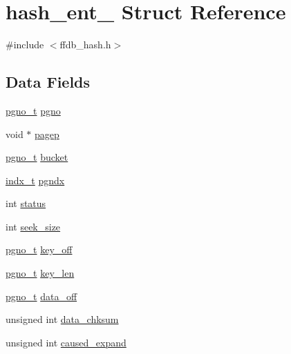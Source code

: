 \hypertarget{structhash__ent__}{}\section{hash\+\_\+ent\+\_\+ Struct Reference}
\label{structhash__ent__}


{\ttfamily \#include $<$ffdb\+\_\+hash.\+h$>$}

\subsection*{Data Fields}
\begin{DoxyCompactItemize}
\item 
\mbox{\hyperlink{other__libs_2filedb_2filehash_2ffdb__db_8h_a000813331643d38481142bcce7de1501}{pgno\+\_\+t}} \mbox{\hyperlink{structhash__ent___a09aab3f7ff5db11d8f4207bb6b517d6f}{pgno}}
\item 
void $\ast$ \mbox{\hyperlink{structhash__ent___ae175bd0cc409d75c94a03e21173f2c39}{pagep}}
\item 
\mbox{\hyperlink{other__libs_2filedb_2filehash_2ffdb__db_8h_a000813331643d38481142bcce7de1501}{pgno\+\_\+t}} \mbox{\hyperlink{structhash__ent___ae2b9802542ef673d965ee83cb4d755f2}{bucket}}
\item 
\mbox{\hyperlink{other__libs_2filedb_2filehash_2ffdb__db_8h_a09ffd06672b99d3312cd7e19d4b05e45}{indx\+\_\+t}} \mbox{\hyperlink{structhash__ent___a6e6bafab03bc8626e663d23d0a99e70a}{pgndx}}
\item 
int \mbox{\hyperlink{structhash__ent___a5ee6daeaf6c53eace7610ddcad3da4d0}{status}}
\item 
int \mbox{\hyperlink{structhash__ent___a8fb6b4a631c3d7a65533740791b34432}{seek\+\_\+size}}
\item 
\mbox{\hyperlink{other__libs_2filedb_2filehash_2ffdb__db_8h_a000813331643d38481142bcce7de1501}{pgno\+\_\+t}} \mbox{\hyperlink{structhash__ent___ae151d24ef5448238d539cd1afa313c02}{key\+\_\+off}}
\item 
\mbox{\hyperlink{other__libs_2filedb_2filehash_2ffdb__db_8h_a000813331643d38481142bcce7de1501}{pgno\+\_\+t}} \mbox{\hyperlink{structhash__ent___a7be4f227a3491a44f7e643f0ca354393}{key\+\_\+len}}
\item 
\mbox{\hyperlink{other__libs_2filedb_2filehash_2ffdb__db_8h_a000813331643d38481142bcce7de1501}{pgno\+\_\+t}} \mbox{\hyperlink{structhash__ent___aeddaa6eeb9c67da3640950876fa466ba}{data\+\_\+off}}
\item 
unsigned int \mbox{\hyperlink{structhash__ent___ac8938cc10c673879a50a0f291713683e}{data\+\_\+chksum}}
\item 
unsigned int \mbox{\hyperlink{structhash__ent___ad466c754efc662c05b8d952ec59314c7}{caused\+\_\+expand}}
\end{DoxyCompactItemize}


